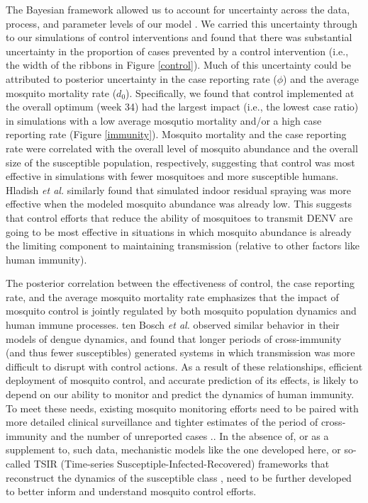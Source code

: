 \documentclass[10pt,letterpaper]{article}
\begin{document}
The Bayesian framework allowed us to account for uncertainty across the data, process, and parameter levels of our model \cite{Berliner1996}.
We carried this uncertainty through to our simulations of control interventions \cite{Elderd2006} and found that there was substantial uncertainty in the proportion of cases prevented by a control intervention (i.e., the width of the ribbons in Figure \ref{control}).
Much of this uncertainty could be attributed to posterior uncertainty in the case reporting rate ($\phi$) and the average mosquito mortality rate ($d_0$).
Specifically, we found that control implemented at the overall optimum (week 34) had the largest impact (i.e., the lowest case ratio) in simulations with a low average  mosqutio mortality and/or a high case reporting rate (Figure \ref{immunity}).
Mosquito mortality and the case reporting rate were correlated with the overall level of mosquito abundance and the overall size of the susceptible population, respectively, suggesting that control was most effective in simulations with fewer mosquitoes and more susceptible humans.  
Hladish \emph{et al.} \cite{Hladish2018} similarly found that simulated indoor residual spraying was more effective when the modeled mosquito abundance was already low.
This suggests that control efforts that reduce the ability of mosquitoes to transmit DENV are going to be most effective in situations in which mosquito abundance is already the limiting component to maintaining transmission (relative to other factors like human immunity).

The posterior correlation between the effectiveness of control, the case reporting rate, and the average mosquito mortality rate emphasizes that the impact of mosquito control is jointly regulated by both mosquito population dynamics and human immune processes.
ten Bosch \emph{et al.} \cite{TenBosch2016} observed similar behavior in their models of dengue dynamics, and found that longer periods of cross-immunity (and thus fewer susceptibles) generated systems in which transmission was more difficult to disrupt with control actions.
As a result of these relationships, efficient deployment of mosquito control, and accurate prediction of its effects, is likely to depend on our ability to monitor and predict the dynamics of human immunity.
To meet these needs, existing mosquito monitoring efforts need to be paired with more detailed clinical surveillance \cite{Morrison2008} and tighter estimates of the period of cross-immunity \cite{TenBosch2016} and the number of unreported cases \cite{Silva2016}..
In the absence of, or as a supplement to, such data, mechanistic models like the one developed here, or so-called TSIR (Time-series Susceptiple-Infected-Recovered) frameworks that reconstruct the dynamics of the susceptible class \cite{Finkenstadt2000, Reich2013}, need to be further developed to better inform and understand mosquito control efforts.
\end{document}
